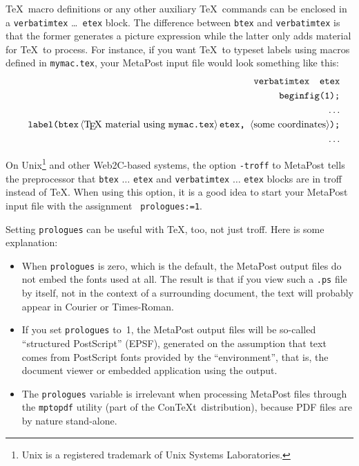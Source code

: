 \documentclass{article} %
\def\ttindex#1{{\tt #1}\index{#1?\texttt{#1}}}
\def\ttt{\texttt}  %
\def\ConTeXt{Con\TeX t}
\newcommand\reg{$^{\hbox{\psyvii\char'322}}$}   %
\newcommand\descr[1]{{\langle\hbox{#1}\rangle}}
\begin{document}
\label{Dverbatimtex}
\TeX\ macro definitions or any other auxiliary \TeX\ commands can be
enclosed in a {\tt verbatimtex}
\ldots\ {\tt etex} block.  The difference
between {\tt btex} and {\tt verbatimtex} is that the former generates a
picture expression while the latter only adds material for \TeX\ to
process.  For instance, if you want \TeX\ to typeset labels using macros
defined in {\tt mymac.tex}, your MetaPost input file would look
something like this:
\begin{eqnarray*}
&& \verb|verbatimtex  etex|\\
&& \verb|beginfig(1);|\\
&& \qquad \dots\\
&& \verb|label(btex|\, \descr{\TeX\ material using \hbox{\tt mymac.tex}}\,
        \verb|etex, | \descr{some coordinates} \hbox{\tt );}\\
&& \qquad \dots
\end{eqnarray*}

On Unix\footnote{Unix is a registered trademark of Unix Systems
Laboratories.}\index{Unix\reg} and other Web2C-based systems, the option
{\tt -troff} to MetaPost tells the preprocessor that {\tt btex} $\ldots$
{\tt etex} and {\tt verbatimtex} $\ldots$ {\tt etex} blocks are in
troff instead of \TeX.  When using this option, it is a
good idea to start your MetaPost input file with the assignment {\tt
prologues:=1}.

\label{Dprologues}
Setting \ttt{prologues} can be useful with \TeX, too, not just troff.
Here is some explanation:

\begin{itemize}
\item When \ttt{prologues} is zero, which is the default, the MetaPost
output files do not embed the fonts used at all.  The result is that if
you view such a \ttt{.ps} file by itself, not in the context of a
surrounding document, the text will probably appear in
Courier or Times-Roman.

\item If you set \ttt{prologues} to~1, the MetaPost
output files will be so-called ``structured
PostScript'' (EPSF), generated
on the assumption that text comes from PostScript fonts provided by the
``environment'', that is, the document viewer or embedded application
using the output.

\item The \ttt{prologues} variable is irrelevant when processing MetaPost
files through the \ttindex{mptopdf} utility (part of the \ConTeXt\
distribution), because PDF files are by nature stand-alone.
\end{itemize}
\end{document}
